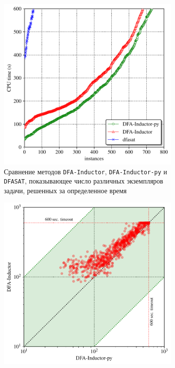 \begin{figure}[ht]
  \centering
  \begin{subfigure}[b]{0,48\textwidth}
    \centering
    \includegraphics[width=\textwidth]{img/lata19/plots/cactus}
    \caption{Сравнение методов \texttt{DFA-Inductor}, \texttt{DFA-Inductor-py} и \texttt{DFASAT}, показывающее число различных экземпляров задачи, решенных за определенное время}
    \label{syn:img:plots:cactus}
  \end{subfigure}%
  \;\;
  \begin{subfigure}[b]{0,48\textwidth}
    \centering
    \includegraphics[width=\textwidth]{img/lata19/plots/scatter}

\end{subfigure}
\end{figure}
